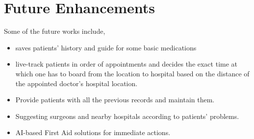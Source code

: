 \section{Future Enhancements}
Some of the future works include,
\begin{itemize}
    \item saves patients' history and guide for some basic medications
    \item live-track patients in order of appointments and decides the exact time at which one has to board from the location to hospital based on the distance of the appointed doctor's hospital location.
    \item Provide patients with all the previous records and maintain them.
    \item Suggesting surgeons and nearby hospitals according to patients' problems.
    \item AI-based First Aid solutions for immediate actions.
    
\end{itemize}


